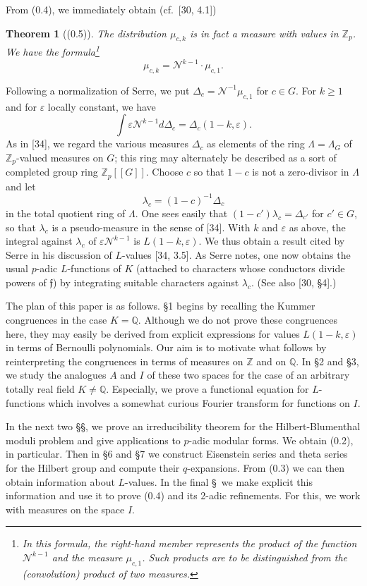 \documentclass[12pt,a4paper]{article}
\theoremstyle{plain}
\newtheorem{theorem}{Theorem}[section]
\theoremstyle{definition}
\newcommand{\ff}{\mathfrak{f}}
\newcommand{\Z}{\mathbb{Z}}
\newcommand{\Q}{\mathbb{Q}}
\begin{document}
From (0.4), we immediately obtain (cf.~[30, 4.1])

\begin{theorem}[(0.5)]
The distribution $\mu_{c,k}$ is in fact a measure with values in $\Z_p$. We have the formula\footnote{In this formula, the right-hand member represents the product of the function $\mathcal{N}^{k-1}$ and the measure $\mu_{c,1}$. Such products are to be distinguished from the (convolution) product of two measures.}
\[
\mu_{c,k}=\mathcal{N}^{k-1}\cdot\mu_{c,1}.
\]
\end{theorem}

Following a normalization of Serre, we put $\Delta_c=\mathcal{N}^{-1}\mu_{c,1}$ for $c\in G$. For $k\ge1$ and for $\varepsilon$ locally constant, we have
\[
\int\varepsilon\mathcal{N}^{k-1}d\Delta_c=\Delta_c(1-k,\varepsilon).
\]
As in [34], we regard the various measures $\Delta_c$ as elements of the ring $\Lambda=\Lambda_G$ of $\Z_p$-valued measures on $G$; this ring may alternately be described as a sort of completed group ring $\Z_p[[G]]$. Choose $c$ so that $1-c$ is not a zero-divisor in $\Lambda$ and let
\[
\lambda_c=(1-c)^{-1}\Delta_c
\]
in the total quotient ring of $\Lambda$. One sees easily that $(1-c')\lambda_c=\Delta_{c'}$ for $c'\in G$, so that $\lambda_c$ is a pseudo-measure in the sense of [34]. With $k$ and $\varepsilon$ as above, the integral against $\lambda_c$ of $\varepsilon\mathcal{N}^{k-1}$ is $L(1-k,\varepsilon)$. We thus obtain a result cited by Serre in his discussion of $L$-values [34, 3.5]. As Serre notes, one now obtains the usual $p$-adic $L$-functions of $K$ (attached to characters whose conductors divide powers of $\ff$) by integrating suitable characters against $\lambda_c$. (See also [30, \S4].)

The plan of this paper is as follows. \S1 begins by recalling the Kummer congruences in the case $K=\Q$. Although we do not prove these congruences here, they may easily be derived from explicit expressions for values $L(1-k,\varepsilon)$ in terms of Bernoulli polynomials. Our aim is to motivate what follows by reinterpreting the congruences in terms of measures on $\Z$ and on $\Q$. In \S2 and \S3, we study the analogues $A$ and $I$ of these two spaces for the case of an arbitrary totally real field $K\neq\Q$. Especially, we prove a functional equation for $L$-functions which involves a somewhat curious Fourier transform for functions on $I$.

In the next two \S\S, we prove an irreducibility theorem for the Hilbert-Blumenthal moduli problem and give applications to $p$-adic modular forms. We obtain (0.2), in particular. Then in \S6 and \S7 we construct Eisenstein series and theta series for the Hilbert group and compute their $q$-expansions. From (0.3) we can then obtain information about $L$-values. In the final \S\ we make explicit this information and use it to prove (0.4) and its 2-adic refinements. For this, we work with measures on the space $I$.
\end{document}
